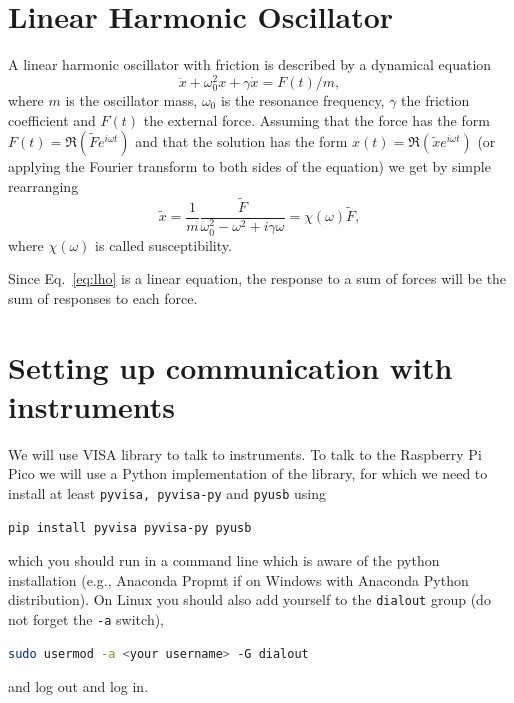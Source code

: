 \documentclass{article}
\newcommand{\ls}[1]{\lstinline{#1}}
\begin{document}


\newpage
\appendix
\section{Linear Harmonic Oscillator}
\label{sec:lho}
A linear harmonic oscillator with friction is described by a dynamical equation
\begin{equation}
    \label{eq:lho}
    \ddot x + \omega_0^2 x + \gamma\dot x = F(t)/m,
\end{equation}
where $m$ is the oscillator mass, $\omega_0$ is the resonance frequency, $\gamma$ the friction coefficient and $F(t)$ the external force. Assuming that the force has the form $F(t) = \Re(\tilde F e^{i\omega t})$ and that the solution has the form $x(t) = \Re(\tilde x e^{i\omega t})$ (or applying the Fourier transform to both sides of the equation) we get by simple rearranging
\begin{equation}
    \tilde x = \frac{1}{m}\frac{\tilde F}{\omega_0^2 - \omega^2 + i\gamma\omega} = \chi(\omega)\tilde F,
\end{equation}
where $\chi(\omega)$ is called susceptibility.

Since Eq.~\ref{eq:lho} is a linear equation, the response to a sum of forces will be the sum of responses to each force.

\section{Setting up communication with instruments}
\label{sec:pico}
We will use VISA library to talk to instruments. To talk to the Raspberry Pi Pico we will use a Python implementation of the library, for which we need to install at least \ls{pyvisa, pyvisa-py} and \ls{pyusb} using
\begin{lstlisting}[language=bash]
    pip install pyvisa pyvisa-py pyusb
\end{lstlisting}
which you should run in a command line which is aware of the python installation (e.g., Anaconda Propmt if on Windows with Anaconda Python distribution). On Linux you should also add yourself to the \ls{dialout} group (do not forget the \ls{-a} switch),
\begin{lstlisting}[language=bash]
    sudo usermod -a <your username> -G dialout 
\end{lstlisting}
and log out and log in.
\end{document}
